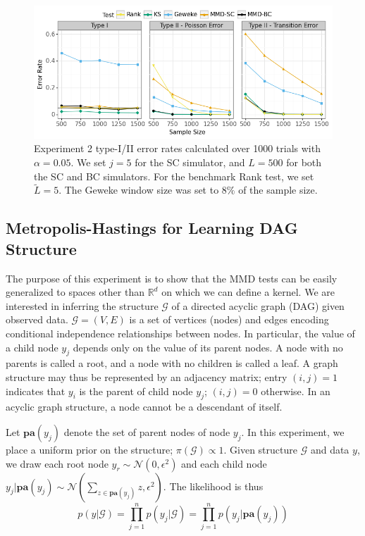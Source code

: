 \documentclass{article}
\begin{document}
\begin{figure}[H]
    \centering
    \includegraphics[width=\textwidth]{figures/results_2.png}
    \caption{Experiment 2 type-I/II error rates calculated over 1000 trials with $\alpha=0.05$.
    We set $j=5$ for the SC simulator, and $L=500$ for both the SC and BC simulators. For the benchmark Rank test, we set $\tilde{L}=5$. The Geweke window size was set to $8\%$ of the sample size.
    }
    \label{fig:ex2_comparison}
\end{figure}

\subsection{Metropolis-Hastings for Learning DAG Structure}
The purpose of this experiment is to show that the MMD tests can be easily generalized to spaces other than $\mathbb{R}^{d}$ on which we can define a kernel. We are interested in inferring the structure $\mathcal{G}$ of a directed acyclic graph (DAG) given observed data. $\mathcal{G}=(V,E)$ is a set of vertices (nodes) and edges encoding conditional independence relationships between nodes. In particular, the value of a child node $y_{j}$ depends only on the value of its parent nodes. A node with no parents is called a root, and a node with no children is called a leaf. A graph structure may thus be represented by an adjacency matrix; entry $(i,j)=1$ indicates that $y_{i}$ is the parent of child node $y_{j}$; $(i,j)=0$ otherwise. In an acyclic graph structure, a node cannot be a descendant of itself.

Let $\mathbf{pa}(y_{j})$ denote the set of parent nodes of node $y_{j}$. In this experiment, we place a uniform  prior on the structure; $\pi(\mathcal{G}) \propto 1$. Given structure $\mathcal{G}$ and data $y$, we draw each root node $y_{r} \sim \mathcal{N}(0, \epsilon^2)$ and each child node $y_{j}|\mathbf{pa}(y_{j}) \sim \mathcal{N}(\sum_{z \in \mathbf{pa}(y_{j})} z, \epsilon^2)$. The likelihood is thus
\begin{equation}
    p(y|\mathcal{G}) = \prod_{j=1}^{n}  p(y_{j}|\mathcal{G}) = \prod_{j=1}^{n} p(y_{j}|\mathbf{pa}(y_{j}))
\end{equation}
\end{document}
